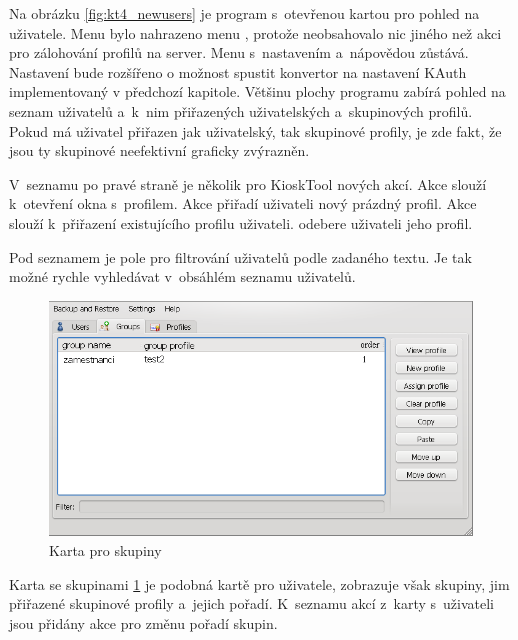 Na obrázku \ref{fig:kt4_newusers} je program s~otevřenou kartou pro pohled na uživatele. Menu  bylo nahrazeno menu , protože neobsahovalo nic jiného než akci pro zálohování profilů na server. Menu s~nastavením a~nápovědou zůstává. Nastavení bude rozšířeno o možnost spustit konvertor na nastavení KAuth implementovaný v předchozí kapitole. Většinu plochy programu zabírá pohled na seznam uživatelů a~k~nim přiřazených uživatelských a~skupinových profilů. Pokud má uživatel přiřazen jak uživatelský, tak skupinové profily, je zde fakt, že jsou ty skupinové neefektivní graficky zvýrazněn.

V~seznamu po pravé straně je několik pro KioskTool nových akcí. Akce  slouží k~otevření okna s~profilem. Akce  přiřadí uživateli nový prázdný profil. Akce  slouží k~přiřazení existujícího profilu uživateli.  odebere uživateli jeho profil.

Pod seznamem je pole pro filtrování uživatelů podle zadaného textu. Je tak možné rychle vyhledávat v~obsáhlém seznamu uživatelů.

\begin{figure}
\centering
\includegraphics[width=13cm]{obrazky/navrh-groupsz.png}
\caption{Karta pro skupiny}
\label{fig:kt4_newgroups}
\end{figure}

Karta se skupinami \ref{fig:kt4_newgroups} je podobná kartě pro uživatele, zobrazuje však skupiny, jim přiřazené skupinové profily a~jejich pořadí. K~seznamu akcí z~karty s~uživateli jsou přidány akce pro změnu pořadí skupin.

